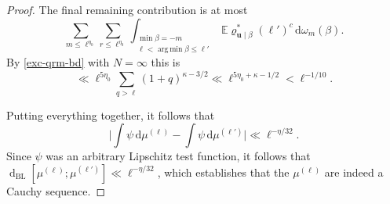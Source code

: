 \documentclass[10pt,a4paper]{amsart}
\DeclareMathOperator*{\argmin}{arg\,min}
\newcommand{\dist}[2]{{\operatorname{d}_{\operatorname{BL}}[#1;#2]}}
\renewcommand{\le}{\leqslant}
\newcommand{\mb}{\mathbb}
\newcommand{\mbf}{\mathbf}
\begin{document}
\begin{proof}
The final remaining contribution is at most
\[ \sum_{m \le \ell^{\eta_0}} \sum_{r \le \ell^{\eta_0}} \int_{\substack{\min \beta = -m \\ \ell < \argmin \beta \le \ell'}} \mb{E} \varrho^*_{\mbf{u} \mid \beta}(\ell')^c \, \mathrm{d}\omega_{m} (\beta).\] By \cref{exc-qrm-bd} with $N = \infty$ this is
\[ \ll \ell^{5\eta_0} \sum_{q > \ell} (1 + q)^{\kappa - 3/2} \ll \ell^{5\eta_0 + \kappa - 1/2} < \ell^{-1/10}.\]


Putting everything together, it follows that 
\[ \big| \int \psi \, \mathrm{d}\mu^{(\ell)} - \int \psi \, \mathrm{d}\mu^{(\ell')} \big| \ll \ell^{-\eta/32}.\] Since $\psi$ was an arbitrary Lipschitz test function, it follows that $\dist{\mu^{(\ell)}}{\mu^{(\ell')}} \ll \ell^{-\eta/32}$, which establishes that the $\mu^{(\ell)}$ are indeed a Cauchy sequence.
\end{proof}
\end{document}
